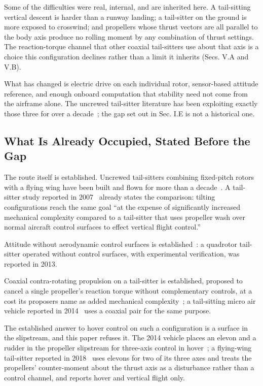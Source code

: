 \documentclass[journal]{new-aiaa}
\begin{document}
Some of the difficulties were real, internal, and are inherited here. A tail-sitting vertical descent is harder than a runway landing; a tail-sitter on the ground is more exposed to crosswind; and propellers whose thrust vectors are all parallel to the body axis produce no rolling moment by any combination of thrust settings. The reaction-torque channel that other coaxial tail-sitters use about that axis is a choice this configuration declines rather than a limit it inherits (Secs. V.A and V.B).

What has changed is electric drive on each individual rotor, sensor-based attitude reference, and enough onboard computation that stability need not come from the airframe alone. The uncrewed tail-sitter literature has been exploiting exactly those three for over a decade~\cite{r2,r3}; the gap set out in Sec. I.E is not a historical one.

\subsection{What Is Already Occupied, Stated Before the Gap}

The route itself is established. Uncrewed tail-sitters combining fixed-pitch rotors with a flying wing have been built and flown for more than a decade~\cite{r2,r3}. A tail-sitter study reported in 2007~\cite{r4} already states the comparison: tilting configurations reach the same goal ``at the expense of significantly increased mechanical complexity compared to a tail-sitter that uses propeller wash over normal aircraft control surfaces to effect vertical flight control.''

Attitude without aerodynamic control surfaces is established~\cite{r3}: a quadrotor tail-sitter operated without control surfaces, with experimental verification, was reported in 2013.

Coaxial contra-rotating propulsion on a tail-sitter is established, proposed to cancel a single propeller's reaction torque without complementary controls, at a cost its proposers name as added mechanical complexity~\cite{r5}; a tail-sitting micro air vehicle reported in 2014~\cite{r6} uses a coaxial pair for the same purpose.

The established answer to hover control on such a configuration is a surface in the slipstream, and this paper refuses it. The 2014 vehicle places an elevon and a rudder in the propeller slipstream for three-axis control in hover~\cite{r6}; a flying-wing tail-sitter reported in 2018~\cite{r7} uses elevons for two of its three axes and treats the propellers' counter-moment about the thrust axis as a disturbance rather than a control channel, and reports hover and vertical flight only.
\end{document}
